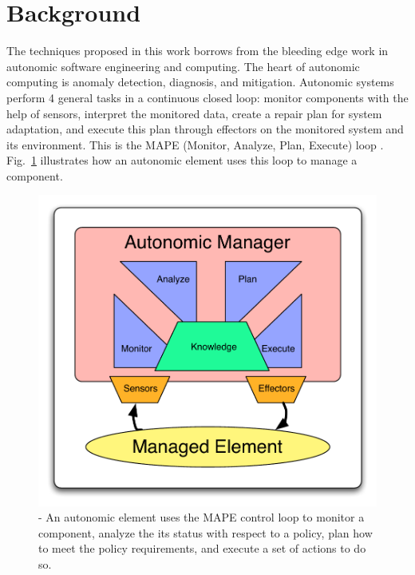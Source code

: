 \section{Background}
\label{sec:background}
The techniques proposed in this work borrows from the bleeding edge work in
autonomic software engineering and computing.  The heart of autonomic computing
is anomaly detection, diagnosis, and mitigation. Autonomic systems perform 4
general tasks in a continuous closed loop: monitor components with the help of
sensors, interpret the monitored data, create a repair plan for system
adaptation, and execute this plan through effectors on the monitored system and
its environment. This is the MAPE (Monitor, Analyze, Plan, Execute) loop
\cite{1160055}. Fig.~\ref{fig:mape} illustrates how an autonomic element uses
this loop to manage a component.

\begin{figure}[tb]
  \centering
  \includegraphics[width=\columnwidth]{images/mape}
  \caption{- An autonomic element uses the MAPE control loop to monitor a
		component, analyze the its status with respect to a policy, plan how to
		meet the policy requirements, and execute a set of actions to do so.}
	\label{fig:mape}
\end{figure}

